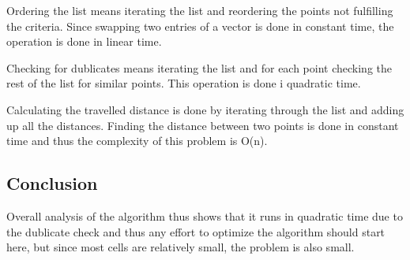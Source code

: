 Ordering the list means iterating the list and reordering the points not
fulfilling the criteria. Since swapping two entries of a vector is done in
constant time, the operation is done in linear time.

Checking for dublicates means iterating the list and for each point checking the
rest of the list for similar points. This operation is done i quadratic time.

Calculating the travelled distance is done by iterating through the list and
adding up all the distances. Finding the distance between two points is done in
constant time and thus the complexity of this problem is O(n).

\subsection{Conclusion}
Overall analysis of the algorithm thus shows that it runs in quadratic time due
to the dublicate check and thus any effort to optimize the algorithm should
start here, but since most cells are relatively small, the problem is also
small.
